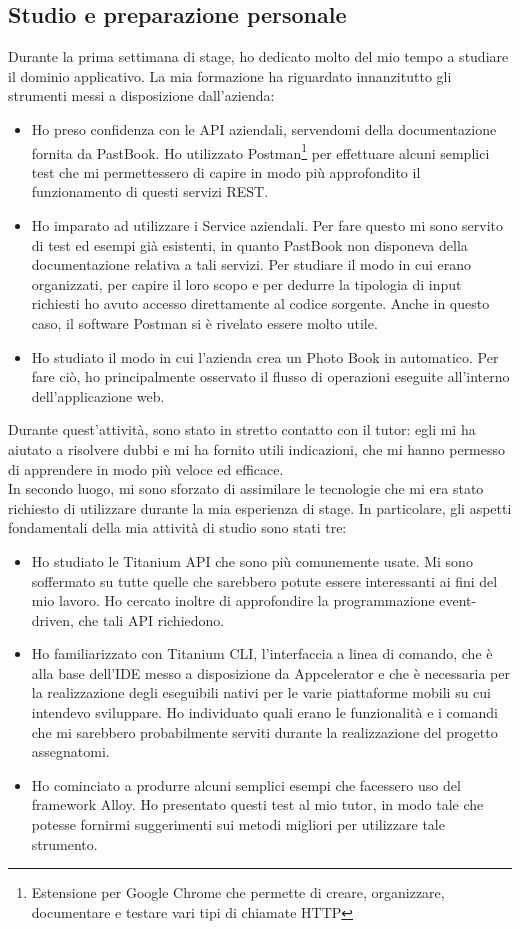 		\subsection{Studio e preparazione personale}
			Durante la prima settimana di stage, ho dedicato molto del mio tempo a studiare il dominio applicativo. La mia formazione ha
			riguardato innanzitutto gli strumenti messi a disposizione dall'azienda:
			\begin{itemize}
				\item Ho preso confidenza con le API aziendali, servendomi della documentazione fornita da PastBook. Ho utilizzato
				Postman\footnote{Estensione per Google Chrome che permette di creare, organizzare, documentare e testare vari tipi di chiamate HTTP} per effettuare alcuni semplici test che mi permettessero di capire in
				modo più approfondito il funzionamento di questi servizi REST.
				\item Ho imparato ad utilizzare i Service aziendali. Per fare questo mi sono servito di test ed esempi già
				esistenti, in quanto PastBook non disponeva della documentazione relativa a tali servizi. Per studiare il modo in cui
				erano organizzati, per capire il loro scopo e per dedurre la tipologia di input richiesti ho avuto accesso
				direttamente al codice sorgente. Anche in questo caso, il software Postman si è rivelato essere molto utile.
				\item Ho studiato il modo in cui l'azienda crea un Photo Book in automatico. Per fare ciò, ho principalmente
				osservato il flusso di operazioni eseguite all'interno dell'applicazione web.
			\end{itemize}
			Durante quest'attività, sono stato in stretto contatto con il tutor: egli mi ha aiutato a risolvere dubbi e mi ha fornito
			utili indicazioni, che mi hanno permesso di apprendere in modo più veloce ed efficace.\\
			In secondo luogo, mi sono sforzato di assimilare le tecnologie che mi era stato richiesto di utilizzare durante la mia
			esperienza di stage. In particolare, gli aspetti fondamentali della mia attività di studio sono stati tre:
			\begin{itemize}
				\item Ho studiato le Titanium API che sono più comunemente usate. Mi sono soffermato su tutte quelle che sarebbero
				potute essere interessanti ai fini del mio lavoro. Ho cercato inoltre di approfondire la programmazione event-driven,
				che tali API richiedono.
				\item Ho familiarizzato con Titanium CLI, l'interfaccia a linea di comando, che è alla base dell'IDE messo a
				disposizione da Appcelerator e che è necessaria per la realizzazione degli eseguibili nativi per le varie piattaforme
				mobili su cui intendevo sviluppare. Ho individuato quali erano le funzionalità e i comandi che mi sarebbero
				probabilmente serviti durante la realizzazione del progetto assegnatomi.
				\item Ho cominciato a produrre alcuni semplici esempi che facessero uso del framework Alloy. Ho presentato questi
				test al mio tutor, in modo tale che potesse fornirmi suggerimenti sui metodi migliori per utilizzare tale strumento.
			\end{itemize}
